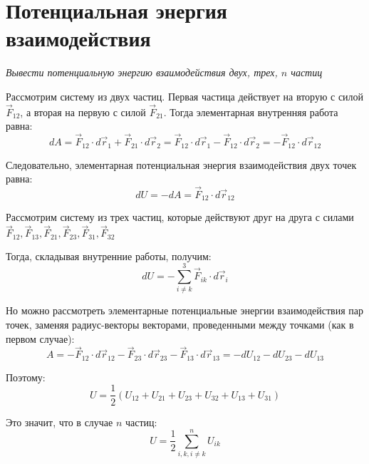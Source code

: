 \documentclass{article}
\begin{document}
   \section{Потенциальная энергия взаимодействия}
    \par
      \textit{Вывести потенциальную энергию взаимодействия двух, трех, $n$ частиц}\\
    \par
      Рассмотрим систему из двух частиц. Первая частица действует на вторую с силой $\vec F_{12}$, а вторая на первую с силой $\vec F_{21}$. Тогда элементарная внутренняя работа равна:
      \begin{equation}
	dA=\vec F_{12}\cdot d\vec r_1 + \vec F_{21}\cdot d\vec r_2 = \vec F_{12}\cdot d\vec r_1 - \vec F_{12}\cdot d\vec r_2 = -\vec F_{12}\cdot d\vec r_{12}
      \end{equation}
    \par
      Следовательно, элементарная потенциальная энергия взаимодействия двух точек равна:
      \begin{equation}
	dU=-dA=\vec F_{12}\cdot d\vec r_{12}
      \end{equation}
    \par
      Рассмотрим систему из трех частиц, которые действуют друг на друга с силами $\vec F_{12}, \vec F_{13}, \vec F_{21}, \vec F_{23}, \vec F_{31}, \vec F_{32} $
    \par
      Тогда, складывая внутренние работы, получим:
      \begin{equation}
	dU=-\sum_{i\neq k}^3\vec F_{ik}\cdot d\vec r_i
      \end{equation}
    \par
      Но можно рассмотреть элементарные потенциальные энергии взаимодействия пар точек, заменяя радиус-векторы векторами, проведенными между точками (как в первом случае):
      \begin{equation}
	A=-\vec F_{12}\cdot d\vec r_{12}-\vec F_{23}\cdot d\vec r_{23}-\vec F_{13}\cdot d\vec r_{13}=-dU_{12}-dU_{23}-dU_{13}
      \end{equation}
    \par
      Поэтому:
      \begin{equation}
	U=\frac{1}{2}(U_{12}+U_{21}+U_{23}+U_{32}+U_{13}+U_{31})
      \end{equation}
    \par
      Это значит, что в случае $n$ частиц:
      \begin{equation}
	U=\frac{1}{2}\sum_{i,k,i\neq k}^n U_{ik}
      \end{equation}      
  \clearpage
  
\end{document}

